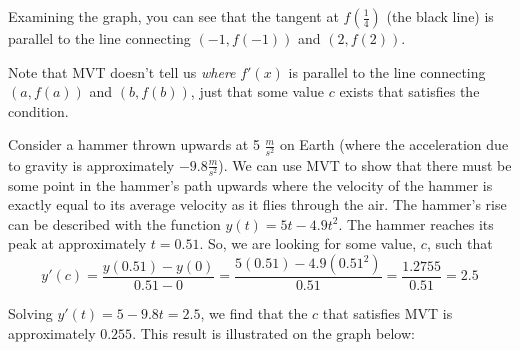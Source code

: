 Examining the graph, you can see that the tangent at $f(\frac{1}{4})$ (the black line) is parallel to the line connecting $(-1, f(-1))$ and $(2, f(2))$. 


Note that MVT doesn't tell us \textit{where} $f'(x)$ is parallel to the line connecting $(a, f(a))$ and $(b, f(b))$, just that some value $c$ exists that satisfies the condition. 

Consider a hammer thrown upwards at 5 $\frac{m}{s^2}$ on Earth (where the acceleration due to gravity is approximately $-9.8 \frac{m}{s^2}$). We can use MVT to show that there must be some point in the hammer's path upwards where the velocity of the hammer is exactly equal to its average velocity as it flies through the air. 
The hammer's rise can be described with the function $y(t) = 5t-4.9t^2$. The hammer reaches its peak at approximately $t=0.51$. So, we are looking for some value, $c$, such that $$y'(c) = \frac{y(0.51)-y(0)}{0.51-0}=\frac{5(0.51)-4.9(0.51^2)}{0.51}=\frac{1.2755}{0.51}=2.5$$

Solving $y'(t) = 5-9.8t = 2.5$, we find that the $c$ that satisfies MVT is approximately $0.255$. This result is illustrated on the graph below:


